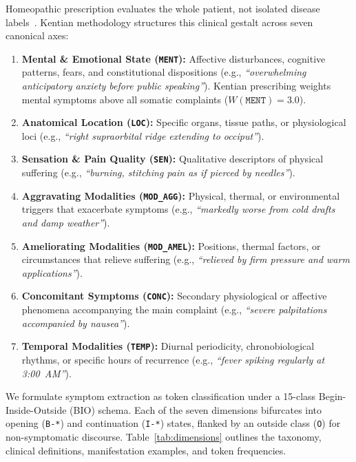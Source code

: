 Homeopathic prescription evaluates the whole patient, not isolated disease labels~\cite{hahnemann1842,kent1897}. Kentian methodology structures this clinical gestalt across seven canonical axes:
\begin{enumerate}
    \item \textbf{Mental \& Emotional State (\texttt{MENT}):} Affective disturbances, cognitive patterns, fears, and constitutional dispositions (e.g., \textit{``overwhelming anticipatory anxiety before public speaking''}). Kentian prescribing weights mental symptoms above all somatic complaints ($W(\texttt{MENT}) = 3.0$).
    \item \textbf{Anatomical Location (\texttt{LOC}):} Specific organs, tissue paths, or physiological loci (e.g., \textit{``right supraorbital ridge extending to occiput''}).
    \item \textbf{Sensation \& Pain Quality (\texttt{SEN}):} Qualitative descriptors of physical suffering (e.g., \textit{``burning, stitching pain as if pierced by needles''}).
    \item \textbf{Aggravating Modalities (\texttt{MOD\_AGG}):} Physical, thermal, or environmental triggers that exacerbate symptoms (e.g., \textit{``markedly worse from cold drafts and damp weather''}).
    \item \textbf{Ameliorating Modalities (\texttt{MOD\_AMEL}):} Positions, thermal factors, or circumstances that relieve suffering (e.g., \textit{``relieved by firm pressure and warm applications''}).
    \item \textbf{Concomitant Symptoms (\texttt{CONC}):} Secondary physiological or affective phenomena accompanying the main complaint (e.g., \textit{``severe palpitations accompanied by nausea''}).
    \item \textbf{Temporal Modalities (\texttt{TEMP}):} Diurnal periodicity, chronobiological rhythms, or specific hours of recurrence (e.g., \textit{``fever spiking regularly at 3:00~AM''}).
\end{enumerate}

We formulate symptom extraction as token classification under a 15-class Begin-Inside-Outside (BIO) schema. Each of the seven dimensions bifurcates into opening (\texttt{B-*}) and continuation (\texttt{I-*}) states, flanked by an outside class (\texttt{O}) for non-symptomatic discourse. Table~\ref{tab:dimensions} outlines the taxonomy, clinical definitions, manifestation examples, and token frequencies.

